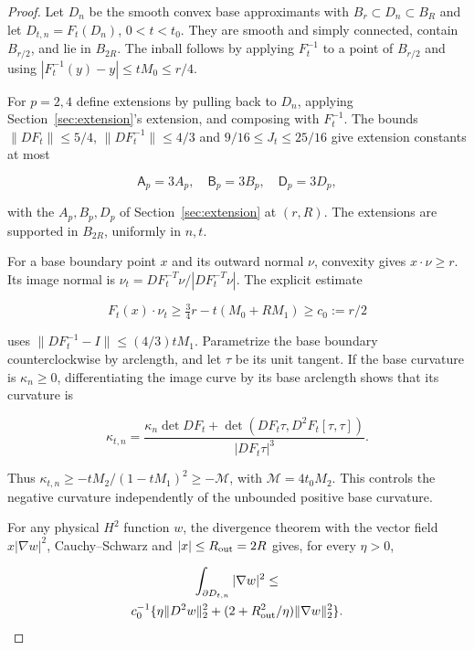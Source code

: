 \documentclass[11pt]{article}
\theoremstyle{definition}
\theoremstyle{remark}
\numberwithin{equation}{section}
\begin{document}
\begin{proof}

Let $D_n$ be the smooth convex base approximants with $B_r\subset D_n\subset B_R$ and let $D_{t,n}=F_t(D_n)$, $0<t<t_0$. They are smooth and simply connected, contain $B_{r/2}$, and lie in $B_{2R}$. The inball follows by applying $F_t^{-1}$ to a point of $B_{r/2}$ and using $|F_t^{-1}(y)-y|\le tM_0\le r/4$.

For $p=2,4$ define extensions by pulling back to $D_n$, applying Section~\ref{sec:extension}'s extension, and composing with $F_t^{-1}$. The bounds $\|DF_t\|\le5/4$, $\|DF_t^{-1}\|\le4/3$ and $9/16\le J_t\le25/16$ give extension constants at most

\begin{equation}\label{eq:src-11-20}
\mathsf A_p=3A_p,\quad \mathsf B_p=3B_p,\quad \mathsf D_p=3D_p,
\end{equation}

with the $A_p,B_p,D_p$ of Section~\ref{sec:extension} at $(r,R)$. The extensions are supported in $B_{2R}$, uniformly in $n,t$.

For a base boundary point $x$ and its outward normal $\nu$, convexity gives $x\cdot\nu\ge r$. Its image normal is $\nu_t=DF_t^{-T}\nu/|DF_t^{-T}\nu|$. The explicit estimate

\begin{equation}\label{eq:src-11-21}
F_t(x)\cdot\nu_t\ge\tfrac34r-t(M_0+RM_1)\ge c_0:=r/2
\end{equation}

uses $\|DF_t^{-1}-I\|\le(4/3)tM_1$. Parametrize the base boundary counterclockwise by arclength, and let $\tau$ be its unit tangent. If the base curvature is $\kappa_n\ge0$, differentiating the image curve by its base arclength shows that its curvature is

\begin{equation}\label{eq:src-11-22}
\kappa_{t,n}=\frac{\kappa_n\det DF_t+ \det(DF_t\tau,D^2F_t[\tau,\tau])}{|DF_t\tau|^3}.
\end{equation}

Thus $\kappa_{t,n}\ge-tM_2/(1-tM_1)^2\ge-\mathcal M$, with $\mathcal M=4t_0M_2$. This controls the negative curvature independently of the unbounded positive base curvature.

For any physical $H^2$ function $w$, the divergence theorem with the vector field $x|\nabla w|^2$, Cauchy--Schwarz and $|x|\le R_{\rm out}=2R$ gives, for every $\eta>0$,

\begin{equation}\label{eq:src-11-23}
\begin{gathered}
\int_{\partial D_{t,n}}|\nabla w|^2\le \\
c_0^{-1}\{\eta\|D^2w\|_2^2+(2+R_{\rm out}^2/\eta)\|\nabla w\|_2^2\}.
\end{gathered}
\end{equation}


\end{proof}
\end{document}
